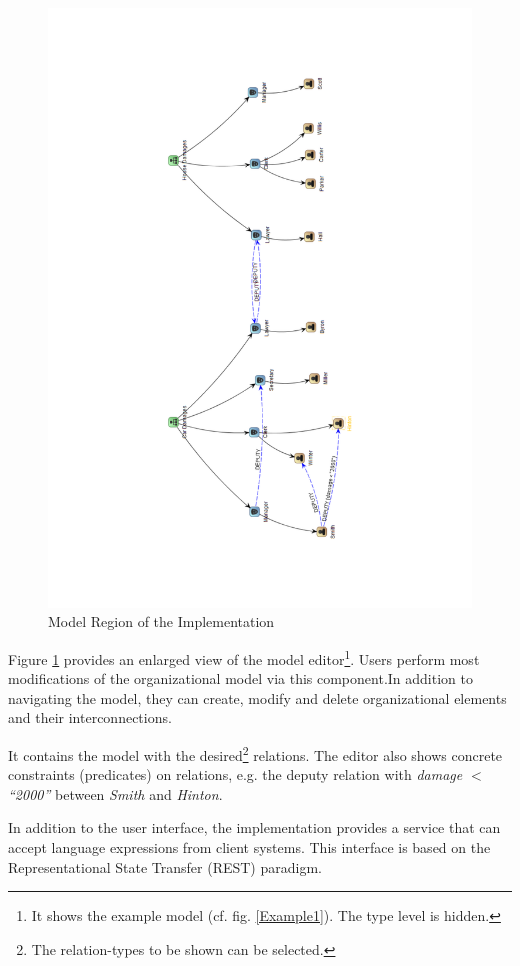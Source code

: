 \begin{figure}
\centering
\includegraphics[width=\textwidth]{Figures/corg-graph.pdf}
\caption{Model Region of the Implementation}
\label{proto-model}
\end{figure}

Figure \ref{proto-model} provides an enlarged view of the model editor\footnote{It shows the example model (cf. fig. \ref{Example1}). The type level is hidden.}. Users perform most modifications of the organizational model via this component.In addition to navigating the model, they can create, modify and delete organizational elements and their interconnections.

It contains the model with the desired\footnote{The relation-types to be shown can be selected.} relations. The editor also shows concrete constraints (predicates) on relations, e.g. the deputy relation with \emph{damage $<$ ``2000''} between \emph{Smith} and \emph{Hinton}.


In addition to the user interface, the implementation provides a service that can accept language expressions from client systems. This interface is based on the Representational State Transfer (REST) paradigm.

